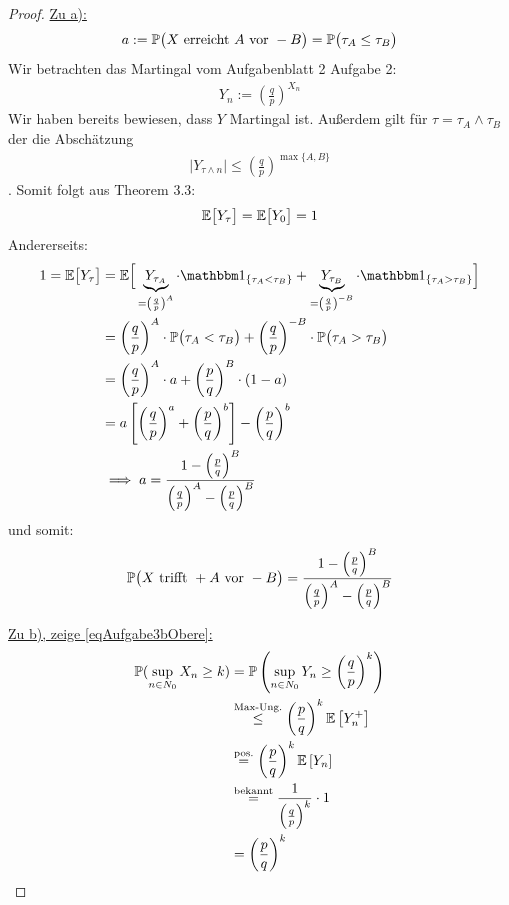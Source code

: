 \documentclass[12pt,a4paper]{article}
\begin{document}
\begin{proof}
\underline{Zu a):}\\
\begin{align*}
a:=\P\big( X\text{ erreicht }A\text{ vor }-B\big)=\P\big(\tau_A\leq\tau_B\big)
\end{align*}
Wir betrachten das Martingal vom Aufgabenblatt 2 Aufgabe 2:
\begin{align*}
	Y_n := \left(\frac{q}{p}\right)^{X_n}
\end{align*}
Wir haben bereits bewiesen, dass $Y$ Martingal ist. Außerdem gilt für \enter$\tau=\tau_A\wedge\tau_B$ der die Abschätzung
\begin{align*}
	\big|Y_{\tau\wedge n}\big|\leq\left(\frac{q}{p}\right)^{\max\lbrace A,B\rbrace}
\end{align*}. Somit folgt aus Theorem 3.3:
\begin{align*}
\E\big[Y_\tau\big]=\E\big[Y_0\big]=1
\end{align*}
Andererseits: 
\begin{align*}
	1=\E\big[Y_\tau\big]&=\E\Big[\underbrace{Y_{\tau_A}}_{=\left(\frac{q}{p}\right)^A}\cdot\indi_{\lbrace\tau_A<\tau_B\rbrace}+\underbrace{Y_{\tau_B}}_{=\left(\frac{q}{p}\right)^{-B}}\cdot\indi_{\lbrace\tau_A>\tau_B\rbrace}\Big]\\
&=\left(\frac{q}{p}\right)^A\cdot\P\big(\tau_A<\tau_B\big)+\left(\frac{q}{p}\right)^{-B}\cdot\P\big(\tau_A>\tau_B\big)\\
&=\left(\frac{q}{p}\right)^A\cdot a+ \left(\frac{p}{q}\right)^{B}\cdot(1-a)\\
&=a\left[\left(\frac{q}{p}\right)^a + \left(\frac{p}{q}\right)^b\right]- \left(\frac{p}{q}\right)^b\\
&\implies
	a=\frac{1-\left(\frac{p}{q}\right)^B}{\left(\frac{q}{p}\right)^A-\left(\frac{p}{q}\right)^B}
\end{align*}
und somit:
\begin{align*}
\P\big(X\text{ trifft }+A\text{ vor }-B\big)&=
	\frac{1-\left(\frac{p}{q}\right)^B}{\left(\frac{q}{p}\right)^A-\left(\frac{p}{q}\right)^B}
\\
\end{align*}

\underline{Zu b), zeige \eqref{eqAufgabe3bObere}:}\\

\begin{align*}
	\P(\sup\limits_{n\in N_0} X_n \geq k) &=
	\P\left(\sup\limits_{n\in N_0} Y_n \geq \left(\frac{q}{p}\right)^k\right) \\
	&\stackrel{\text{Max-Ung.}}{\leq}
	\left(\frac{p}{q}\right)^k\E\left[Y_n^+\right] \\
	&\stackeq{\text{pos.}}
	\left(\frac{p}{q}\right)^k\E\left[Y_n\right] \\
	&\stackeq{\text{bekannt}}
	\frac{1}{\left(\frac{q}{p}\right)^k}\cdot1 \\
	&=\left(\frac{p}{q}\right)^k
\end{align*}


\end{proof}
\end{document}
